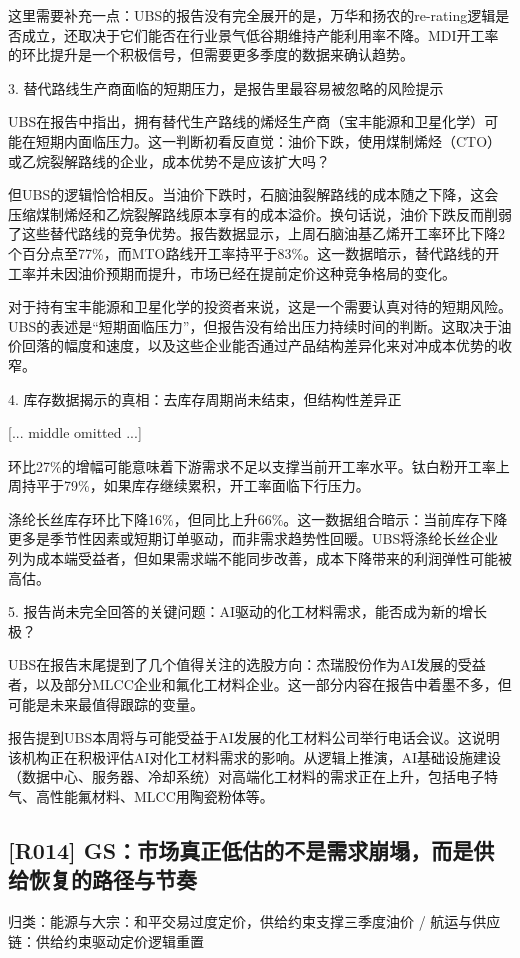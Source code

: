 \documentclass[11pt]{ctexart}
\begin{document}
这里需要补充一点：UBS的报告没有完全展开的是，万华和扬农的re-rating逻辑是否成立，还取决于它们能否在行业景气低谷期维持产能利用率不降。MDI开工率的环比提升是一个积极信号，但需要更多季度的数据来确认趋势。

3. 替代路线生产商面临的短期压力，是报告里最容易被忽略的风险提示

UBS在报告中指出，拥有替代生产路线的烯烃生产商（宝丰能源和卫星化学）可能在短期内面临压力。这一判断初看反直觉：油价下跌，使用煤制烯烃（CTO）或乙烷裂解路线的企业，成本优势不是应该扩大吗？

但UBS的逻辑恰恰相反。当油价下跌时，石脑油裂解路线的成本随之下降，这会压缩煤制烯烃和乙烷裂解路线原本享有的成本溢价。换句话说，油价下跌反而削弱了这些替代路线的竞争优势。报告数据显示，上周石脑油基乙烯开工率环比下降2个百分点至77\%，而MTO路线开工率持平于83\%。这一数据暗示，替代路线的开工率并未因油价预期而提升，市场已经在提前定价这种竞争格局的变化。

对于持有宝丰能源和卫星化学的投资者来说，这是一个需要认真对待的短期风险。UBS的表述是“短期面临压力”，但报告没有给出压力持续时间的判断。这取决于油价回落的幅度和速度，以及这些企业能否通过产品结构差异化来对冲成本优势的收窄。

4. 库存数据揭示的真相：去库存周期尚未结束，但结构性差异正

[... middle omitted ...]

环比27\%的增幅可能意味着下游需求不足以支撑当前开工率水平。钛白粉开工率上周持平于79\%，如果库存继续累积，开工率面临下行压力。

涤纶长丝库存环比下降16\%，但同比上升66\%。这一数据组合暗示：当前库存下降更多是季节性因素或短期订单驱动，而非需求趋势性回暖。UBS将涤纶长丝企业列为成本端受益者，但如果需求端不能同步改善，成本下降带来的利润弹性可能被高估。

5. 报告尚未完全回答的关键问题：AI驱动的化工材料需求，能否成为新的增长极？

UBS在报告末尾提到了几个值得关注的选股方向：杰瑞股份作为AI发展的受益者，以及部分MLCC企业和氟化工材料企业。这一部分内容在报告中着墨不多，但可能是未来最值得跟踪的变量。

报告提到UBS本周将与可能受益于AI发展的化工材料公司举行电话会议。这说明该机构正在积极评估AI对化工材料需求的影响。从逻辑上推演，AI基础设施建设（数据中心、服务器、冷却系统）对高端化工材料的需求正在上升，包括电子特气、高性能氟材料、MLCC用陶瓷粉体等。

\subsection{[R014] GS：市场真正低估的不是需求崩塌，而是供给恢复的路径与节奏}
{\small\color{refgray}归类：能源与大宗：和平交易过度定价，供给约束支撑三季度油价 / 航运与供应链：供给约束驱动定价逻辑重置}
\end{document}
